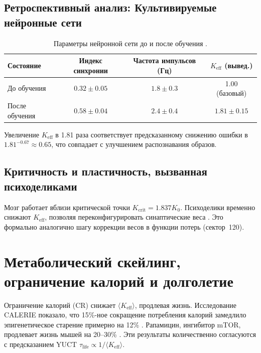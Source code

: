 \documentclass[11pt,a4paper]{article}
\begin{document}
	\subsection{Ретроспективный анализ: Культивируемые нейронные сети}
	
	\begin{table}[H]
		\centering
		\caption{Параметры нейронной сети до и после обучения \cite{PLOS2025b}.}
		\label{tab:neural-training}
		\begin{tabular}{lccc}
			\toprule
			\textbf{Состояние} & \textbf{Индекс синхронии} & \textbf{Частота импульсов (Гц)} & \(K_{\text{eff}}\) (вывед.) \\
			\midrule
			До обучения & \(0.32 \pm 0.05\) & \(1.8 \pm 0.3\) & 1.00 (базовый) \\
			После обучения & \(0.58 \pm 0.04\) & \(2.4 \pm 0.4\) & \(1.81 \pm 0.15\) \\
			\bottomrule
		\end{tabular}
	\end{table}
	
	Увеличение \(K_{\text{eff}}\) в 1.81 раза соответствует предсказанному снижению ошибки в \(1.81^{-0.67} \approx 0.65\), что совпадает с улучшением распознавания образов.
	
	\subsection{Критичность и пластичность, вызванная психоделиками}
	
	Мозг работает вблизи критической точки \(K_{\mathrm{crit}} = 1.837 K_0\). Психоделики временно снижают \(K_{\text{eff}}\), позволяя переконфигурировать синаптические веса \cite{CarhartHarris2018, CarhartHarris2023}. Это формально аналогично шагу коррекции весов в функции потерь (сектор~120).
	
	\section{Метаболический скейлинг, ограничение калорий и долголетие}
	\label{sec:metabolism}
	
	Ограничение калорий (CR) снижает \(\langle K_{\text{eff}} \rangle\), продлевая жизнь. Исследование CALERIE показало, что 15\%-ное сокращение потребления калорий замедлило эпигенетическое старение примерно на 12\% \cite{CALERIE2018}. Рапамицин, ингибитор mTOR, продлевает жизнь мышей на 20–30\% \cite{Miller2022}. Эти результаты количественно согласуются с предсказанием YUCT \(\tau_{\text{life}} \propto 1/\langle K_{\text{eff}} \rangle\).
	
\end{document}
